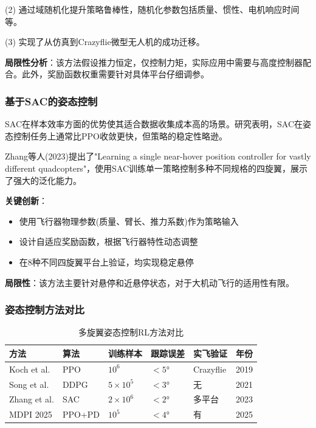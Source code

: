 \documentclass[12pt,a4paper]{ctexart}
\begin{document}
(2) 通过域随机化提升策略鲁棒性，随机化参数包括质量、惯性、电机响应时间等。

(3) 实现了从仿真到Crazyflie微型无人机的成功迁移。

\textbf{局限性分析}：该方法假设推力恒定，仅控制力矩，实际应用中需要与高度控制器配合。此外，奖励函数权重需要针对具体平台仔细调参。

\subsubsection{基于SAC的姿态控制}

SAC在样本效率方面的优势使其适合数据收集成本高的场景。研究表明，SAC在姿态控制任务上通常比PPO收敛更快，但策略的稳定性略逊。

Zhang等人(2023)提出了"Learning a single near-hover position controller for vastly different quadcopters"，使用SAC训练单一策略控制多种不同规格的四旋翼，展示了强大的泛化能力。

\textbf{关键创新}：
\begin{itemize}
    \item 使用飞行器物理参数(质量、臂长、推力系数)作为策略输入
    \item 设计自适应奖励函数，根据飞行器特性动态调整
    \item 在8种不同四旋翼平台上验证，均实现稳定悬停
\end{itemize}

\textbf{局限性}：该方法主要针对悬停和近悬停状态，对于大机动飞行的适用性有限。

\subsubsection{姿态控制方法对比}

\begin{table}[htbp]
\centering
\caption{多旋翼姿态控制RL方法对比}\label{tab:attitude_comparison}
\begin{tabular}{@{}llllll@{}}
\toprule
\textbf{方法} & \textbf{算法} & \textbf{训练样本} & \textbf{跟踪误差} & \textbf{实飞验证} & \textbf{年份} \\
\midrule
Koch et al. & PPO & $10^6$ & $<5°$ & Crazyflie & 2019 \\
Song et al. & DDPG & $5\times10^5$ & $<3°$ & 无 & 2021 \\
Zhang et al. & SAC & $2\times10^6$ & $<2°$ & 多平台 & 2023 \\
MDPI 2025 & PPO+PD & $10^5$ & $<4°$ & 有 & 2025 \\
\bottomrule
\end{tabular}
\end{table}
\end{document}
